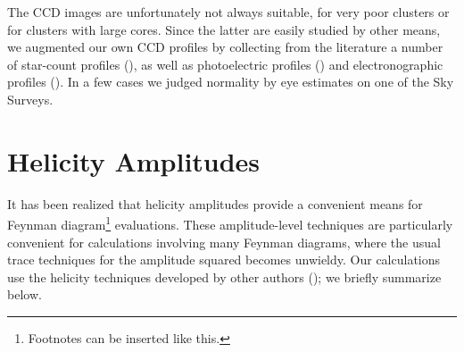 The CCD images are unfortunately not always suitable, for very poor 
clusters or for clusters with large cores.  Since the latter are easily 
studied by other means, we augmented our own CCD profiles by collecting
from the literature a number of star-count
profiles (\cite{kin68,pet76,har84,ort85}),
as well as photoelectric profiles (\cite{kin66}) and 
electronographic profiles (\cite{kro84}).
In a few cases we judged normality by eye estimates on one of the Sky
Surveys. 





\section{Helicity Amplitudes}

It has been realized that helicity amplitudes provide a convenient means
for Feynman diagram\footnote{Footnotes can be inserted like this.}
evaluations.  These amplitude-level techniques
are particularly convenient for calculations involving many Feynman
diagrams, where the usual trace techniques for the amplitude
squared becomes unwieldy.  Our calculations use the helicity techniques
developed by other authors (\cite{hag86}); we briefly summarize below.

